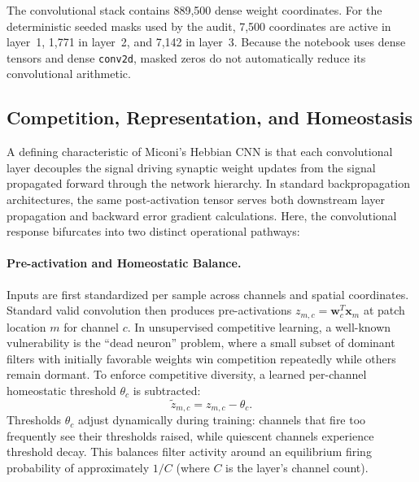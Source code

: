 \documentclass{article}
\begin{document}
    The convolutional stack contains 889,500 dense weight coordinates. For the deterministic seeded masks used by the audit, 7,500 coordinates are active in layer~1, 1,771 in layer~2, and 7,142 in layer~3. Because the notebook uses dense tensors and dense \texttt{conv2d}, masked zeros do not automatically reduce its convolutional arithmetic.
    
    \subsection{Competition, Representation, and Homeostasis}
    
    A defining characteristic of Miconi's Hebbian CNN is that each convolutional layer decouples the signal driving synaptic weight updates from the signal propagated forward through the network hierarchy. In standard backpropagation architectures, the same post-activation tensor serves both downstream layer propagation and backward error gradient calculations. Here, the convolutional response bifurcates into two distinct operational pathways:
    
    \paragraph{Pre-activation and Homeostatic Balance.}
    Inputs are first standardized per sample across channels and spatial coordinates. Standard valid convolution then produces pre-activations $z_{m,c} = \mathbf{w}_c^T \mathbf{x}_m$ at patch location $m$ for channel $c$. In unsupervised competitive learning, a well-known vulnerability is the ``dead neuron'' problem, where a small subset of dominant filters with initially favorable weights win competition repeatedly while others remain dormant. To enforce competitive diversity, a learned per-channel homeostatic threshold $\theta_c$ is subtracted:
    \begin{equation}
    \tilde{z}_{m,c} = z_{m,c} - \theta_c.
    \end{equation}
    Thresholds $\theta_c$ adjust dynamically during training: channels that fire too frequently see their thresholds raised, while quiescent channels experience threshold decay. This balances filter activity around an equilibrium firing probability of approximately $1/C$ (where $C$ is the layer's channel count).
    
\end{document}
